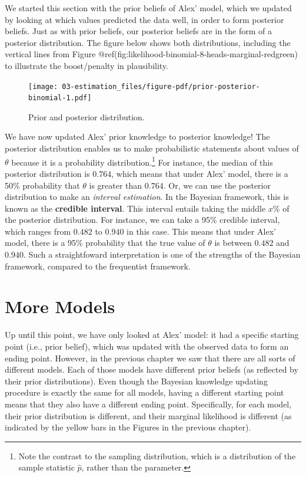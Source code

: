 \documentclass[
  letterpaper,
  DIV=11,
  numbers=noendperiod]{scrreprt}
\begin{document}
We started this section with the prior beliefs of Alex' model, which we
updated by looking at which values predicted the data well, in order to
form posterior beliefs. Just as with prior beliefs, our posterior
beliefs are in the form of a posterior distribution. The figure below
shows both distributions, including the vertical lines from Figure
@ref(fig:likelihood-binomial-8-heads-marginal-redgreen) to illustrate
the boost/penalty in plausibility.

\begin{figure}

{\centering \texttt{[image: 03-estimation\_files/figure-pdf/prior-posterior-binomial-1.pdf]}

}

\caption{Prior and posterior distribution.}

\end{figure}

We have now updated Alex' prior knowledge to posterior knowledge! The
posterior distribution enables us to make probabilistic statements about
values of \(\theta\) because it is a probability
distribution.\footnote{Note the contrast to the sampling distribution,
  which is a distribution of the sample statistic \(\hat{p}\), rather
  than the parameter.} For instance, the median of this posterior
distribution is \(0.764\), which means that under Alex' model, there is
a 50\% probability that \(\theta\) is greater than \(0.764\). Or, we can
use the posterior distribution to make an \emph{interval estimation}. In
the Bayesian framework, this is known as the \textbf{credible interval}.
This interval entails taking the middle \(x\)\% of the posterior
distribution. For instance, we can take a 95\% credible interval, which
ranges from \(0.482\) to \(0.940\) in this case. This means that under
Alex' model, there is a 95\% probability that the true value of
\(\theta\) is between \(0.482\) and \(0.940\). Such a straightfoward
interpretation is one of the strengths of the Bayesian framework,
compared to the frequentist framework.

\hypertarget{more-models}{%
\section{More Models}\label{more-models}}

Up until this point, we have only looked at Alex' model: it had a
specific starting point (i.e., prior belief), which was updated with the
observed data to form an ending point. However, in the previous chapter
we saw that there are all sorts of different models. Each of those
models have different prior beliefs (as reflected by their prior
distributions). Even though the Bayesian knowledge updating procedure is
exactly the same for all models, having a different starting point means
that they also have a different ending point. Specifically, for each
model, their prior distribution is different, and their marginal
likelihood is different (as indicated by the yellow bars in the Figures
in the previous chapter).
\end{document}
